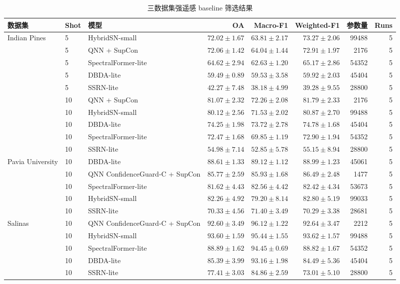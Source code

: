 \documentclass[UTF8,a4paper,zihao=-4,fontset=fandol]{ctexart}
\begin{document}
\begin{table}[htbp]
\centering
\caption{三数据集强遥感 baseline 筛选结果}
\label{tab:strong-baseline}
\begin{adjustbox}{max width=\textwidth}
\begin{tabular}{lllrrrrr}
\toprule
数据集 & Shot & 模型 & OA & Macro-F1 & Weighted-F1 & 参数量 & Runs \\
\midrule
\multirow{10}{*}{Indian Pines}
& 5 & HybridSN-small & $72.02\pm1.67$ & $63.81\pm2.17$ & $73.27\pm2.06$ & 99488 & 5 \\
& 5 & QNN + SupCon & $72.06\pm1.42$ & $64.04\pm1.44$ & $72.91\pm1.97$ & 2176 & 5 \\
& 5 & SpectralFormer-lite & $64.62\pm2.94$ & $62.63\pm1.20$ & $65.17\pm2.86$ & 54352 & 5 \\
& 5 & DBDA-lite & $59.49\pm0.89$ & $59.53\pm3.58$ & $59.92\pm2.03$ & 45404 & 5 \\
& 5 & SSRN-lite & $42.27\pm7.48$ & $38.18\pm4.99$ & $39.28\pm9.55$ & 28800 & 5 \\
& 10 & QNN + SupCon & $81.07\pm2.32$ & $72.26\pm2.08$ & $81.79\pm2.33$ & 2176 & 5 \\
& 10 & HybridSN-small & $80.12\pm2.56$ & $71.53\pm2.02$ & $80.87\pm2.70$ & 99488 & 5 \\
& 10 & DBDA-lite & $74.25\pm1.98$ & $73.72\pm2.78$ & $74.78\pm1.68$ & 45404 & 5 \\
& 10 & SpectralFormer-lite & $72.47\pm1.68$ & $69.85\pm1.19$ & $72.90\pm1.94$ & 54352 & 5 \\
& 10 & SSRN-lite & $54.98\pm7.14$ & $52.85\pm5.78$ & $55.15\pm8.94$ & 28800 & 5 \\
\midrule
\multirow{5}{*}{Pavia University}
& 10 & DBDA-lite & $88.61\pm1.33$ & $89.12\pm1.12$ & $88.99\pm1.23$ & 45061 & 5 \\
& 10 & QNN ConfidenceGuard-C + SupCon & $85.77\pm2.59$ & $85.93\pm1.68$ & $86.49\pm2.48$ & 1477 & 5 \\
& 10 & SpectralFormer-lite & $81.62\pm4.43$ & $82.56\pm4.42$ & $82.42\pm4.34$ & 53673 & 5 \\
& 10 & HybridSN-small & $82.26\pm4.92$ & $79.20\pm8.14$ & $82.80\pm5.19$ & 99033 & 5 \\
& 10 & SSRN-lite & $70.33\pm4.56$ & $71.40\pm3.49$ & $70.29\pm3.38$ & 28681 & 5 \\
\midrule
\multirow{5}{*}{Salinas}
& 10 & QNN ConfidenceGuard-C + SupCon & $92.60\pm3.49$ & $96.12\pm1.22$ & $92.64\pm3.47$ & 2212 & 5 \\
& 10 & HybridSN-small & $93.60\pm1.59$ & $95.44\pm1.55$ & $93.62\pm1.57$ & 99488 & 5 \\
& 10 & SpectralFormer-lite & $88.89\pm1.62$ & $94.45\pm0.69$ & $88.82\pm1.67$ & 54352 & 5 \\
& 10 & DBDA-lite & $85.39\pm3.99$ & $93.16\pm1.98$ & $84.49\pm5.36$ & 45404 & 5 \\
& 10 & SSRN-lite & $77.41\pm3.03$ & $84.86\pm2.59$ & $73.01\pm5.10$ & 28800 & 5 \\
\bottomrule
\end{tabular}
\end{adjustbox}
\end{table}
\end{document}
